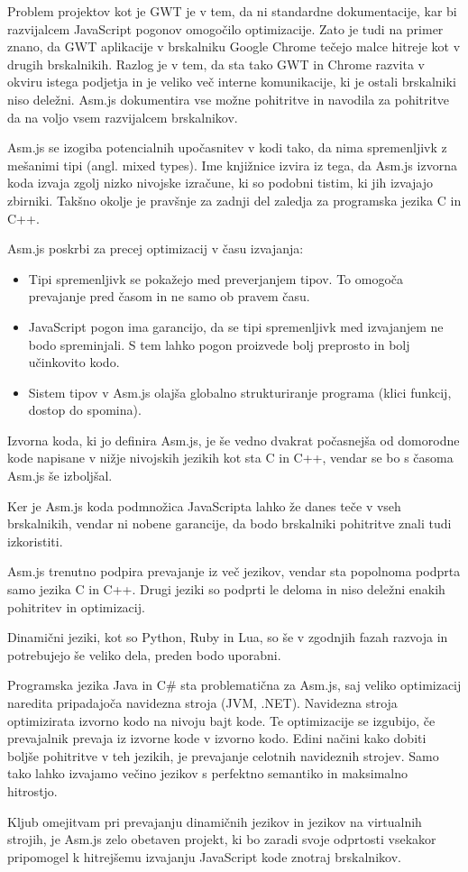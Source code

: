 Problem projektov kot je GWT je v tem, da ni standardne dokumentacije, kar bi razvijalcem JavaScript pogonov omogočilo optimizacije. Zato je tudi na primer znano, da GWT aplikacije v brskalniku Google Chrome tečejo malce hitreje kot v drugih brskalnikih. Razlog je v tem, da sta tako GWT in Chrome razvita v okviru istega podjetja in je veliko več interne komunikacije, ki je ostali brskalniki niso deležni. Asm.js dokumentira vse možne pohitritve in navodila za pohitritve da na voljo vsem razvijalcem brskalnikov.

Asm.js se izogiba potencialnih upočasnitev v kodi tako, da nima spremenljivk z mešanimi tipi (angl. mixed types). Ime knjižnice izvira iz tega, da Asm.js izvorna koda izvaja zgolj nizko nivojske izračune, ki so podobni tistim, ki jih izvajajo zbirniki. Takšno okolje je pravšnje za zadnji del zaledja za programska jezika C in C++.

Asm.js poskrbi za precej optimizacij v času izvajanja:

\begin{itemize}
\item Tipi spremenljivk se pokažejo med preverjanjem tipov. To omogoča prevajanje pred časom in ne samo ob pravem času.
\item JavaScript pogon ima garancijo, da se tipi spremenljivk med izvajanjem ne bodo spreminjali. S tem lahko pogon proizvede bolj preprosto in bolj učinkovito kodo. 
\item Sistem tipov v Asm.js olajša globalno strukturiranje programa (klici funkcij, dostop do spomina).
\end{itemize}

Izvorna koda, ki jo definira Asm.js, je še vedno dvakrat počasnejša od domorodne kode napisane v nižje nivojskih jezikih kot sta C in C++, vendar se bo s časoma Asm.js še izboljšal.

Ker je Asm.js koda podmnožica JavaScripta lahko že danes teče v vseh brskalnikih, vendar ni nobene garancije, da bodo brskalniki pohitritve znali tudi izkoristiti.

Asm.js trenutno podpira prevajanje iz več jezikov, vendar sta popolnoma podprta samo jezika C in C++. Drugi jeziki so podprti le deloma in niso deležni enakih pohitritev in optimizacij.

Dinamični jeziki, kot so Python, Ruby in Lua, so še v zgodnjih fazah razvoja in potrebujejo še veliko dela, preden bodo uporabni.

Programska jezika Java in C\# sta problematična za Asm.js, saj veliko optimizacij naredita pripadajoča navidezna stroja (JVM, .NET). Navidezna stroja optimizirata izvorno kodo na nivoju bajt kode. Te optimizacije se izgubijo, če prevajalnik prevaja iz izvorne kode v izvorno kodo. Edini načini kako dobiti boljše pohitritve v teh jezikih, je prevajanje celotnih navideznih strojev. Samo tako lahko izvajamo večino jezikov s perfektno semantiko in maksimalno hitrostjo.

Kljub omejitvam pri prevajanju dinamičnih jezikov in jezikov na virtualnih strojih, je Asm.js zelo obetaven projekt, ki bo zaradi svoje odprtosti vsekakor pripomogel k hitrejšemu izvajanju JavaScript kode znotraj brskalnikov.
